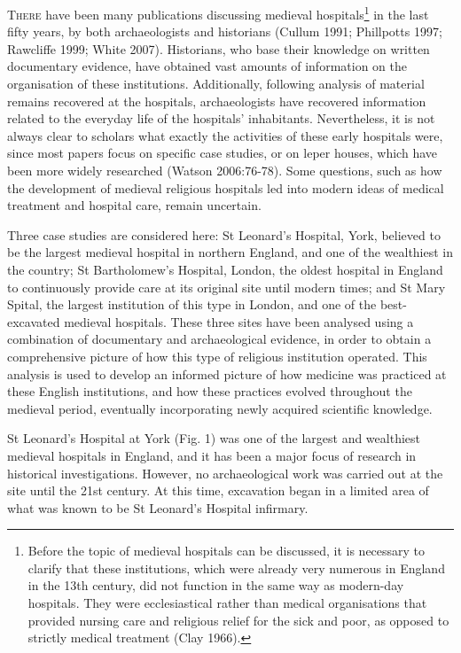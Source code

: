 \documentclass[%
	]{ijsra}
\begin{document}
\IJSRAopening%
\lettrine{T}{here} have been many publications discussing medieval hospitals\footnote{Before the topic of medieval hospitals can be discussed, it is necessary to clarify that these institutions, which were already very numerous in England in the 13th century, did not function in the same way as modern-day hospitals. They were ecclesiastical rather than medical organisations that provided nursing care and religious relief for the sick and poor, as opposed to strictly medical treatment (Clay 1966).} 
in the last fifty years, by both archaeologists and historians (Cullum 1991; Phillpotts 1997; Rawcliffe 1999; White 2007). 
Historians, who base their knowledge on written documentary evidence, have obtained vast amounts of information on the organisation of these institutions. Additionally, following analysis of material remains recovered at the hospitals, archaeologists have recovered information related to the everyday life of the hospitals’ inhabitants. Nevertheless, it is not always clear to scholars what exactly the activities of these early hospitals were, since most papers focus on specific case studies, or on leper houses, which have been more widely researched (Watson 2006:76-78). 
Some questions, such as how the development of medieval religious hospitals led into modern ideas of medical treatment and hospital care, remain uncertain.

Three case studies are considered here: St Leonard’s Hospital, York, believed to be the largest medieval hospital in northern England, and one of the wealthiest in the country; St Bartholomew’s Hospital, London, the oldest hospital in England to continuously provide care at its original site until modern times; and St Mary Spital, the largest institution of this type in London, and one of the best-excavated medieval hospitals. 
These three sites have been analysed using a combination of documentary and archaeological evidence, in order to obtain a comprehensive picture of how this type of religious institution operated. This analysis is used to develop an informed picture of how medicine was practiced at these English institutions, and how these practices evolved throughout the medieval period, eventually incorporating newly acquired scientific knowledge.


St Leonard’s Hospital at York (Fig. 1) %
 was one of the largest and wealthiest medieval hospitals in England, and it has been a major focus of research in historical investigations. However, no archaeological work was carried out at the site until the 21st century. 
 At this time, excavation began in a limited area of what was known to be St Leonard’s Hospital infirmary.
 
\end{document}

